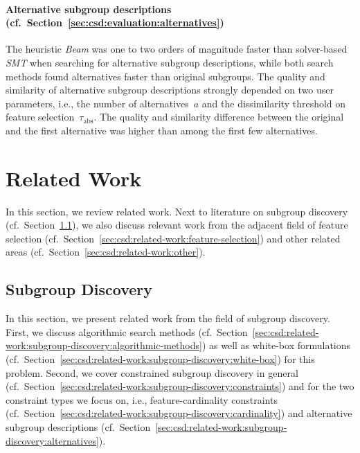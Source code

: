 \documentclass{article}
\theoremstyle{definition}
\begin{document}
\paragraph{Alternative subgroup descriptions (cf.~Section~\ref{sec:csd:evaluation:alternatives})}

The heuristic \emph{Beam} was one to two orders of magnitude faster than solver-based \emph{SMT} when searching for alternative subgroup descriptions, while both search methods found alternatives faster than original subgroups.
The quality and similarity of alternative subgroup descriptions strongly depended on two user parameters, i.e., the number of alternatives~$a$ and the dissimilarity threshold on feature selection~$\tau_{\text{abs}}$.
The quality and similarity difference between the original and the first alternative was higher than among the first few alternatives.

\section{Related Work}
\label{sec:csd:related-work}

In this section, we review related work.
Next to literature on subgroup discovery (cf.~Section~\ref{sec:csd:related-work:subgroup-discovery}), we also discuss relevant work from the adjacent field of feature selection (cf.~Section~\ref{sec:csd:related-work:feature-selection}) and other related areas (cf.~Section~\ref{sec:csd:related-work:other}).

\subsection{Subgroup Discovery}
\label{sec:csd:related-work:subgroup-discovery}

In this section, we present related work from the field of subgroup discovery.
First, we discuss algorithmic search methods (cf.~Section~\ref{sec:csd:related-work:subgroup-discovery:algorithmic-methods}) as well as white-box formulations (cf.~Section~\ref{sec:csd:related-work:subgroup-discovery:white-box}) for this problem.
Second, we cover constrained subgroup discovery in general (cf.~Section~\ref{sec:csd:related-work:subgroup-discovery:constraints}) and for the two constraint types we focus on, i.e., feature-cardinality constraints (cf.~Section~\ref{sec:csd:related-work:subgroup-discovery:cardinality}) and alternative subgroup descriptions (cf.~Section~\ref{sec:csd:related-work:subgroup-discovery:alternatives}).
\end{document}
